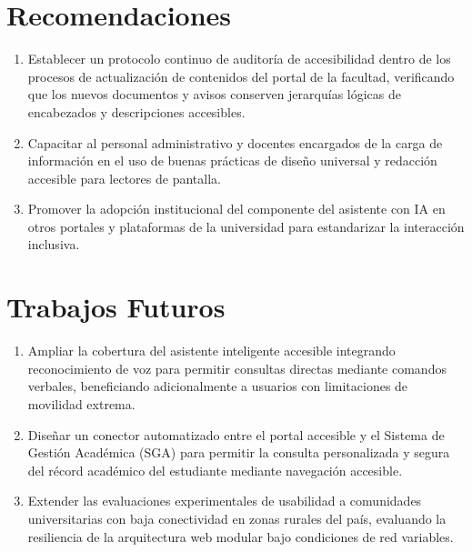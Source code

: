 \section{Recomendaciones}
\begin{enumerate}
  \item Establecer un protocolo continuo de auditoría de accesibilidad dentro de los procesos de actualización de contenidos del portal de la facultad, verificando que los nuevos documentos y avisos conserven jerarquías lógicas de encabezados y descripciones accesibles.
  \item Capacitar al personal administrativo y docentes encargados de la carga de información en el uso de buenas prácticas de diseño universal y redacción accesible para lectores de pantalla.
  \item Promover la adopción institucional del componente del asistente con IA en otros portales y plataformas de la universidad para estandarizar la interacción inclusiva.
\end{enumerate}

\section{Trabajos Futuros}
\begin{enumerate}
  \item Ampliar la cobertura del asistente inteligente accesible integrando reconocimiento de voz para permitir consultas directas mediante comandos verbales, beneficiando adicionalmente a usuarios con limitaciones de movilidad extrema.
  \item Diseñar un conector automatizado entre el portal accesible y el Sistema de Gestión Académica (SGA) para permitir la consulta personalizada y segura del récord académico del estudiante mediante navegación accesible.
  \item Extender las evaluaciones experimentales de usabilidad a comunidades universitarias con baja conectividad en zonas rurales del país, evaluando la resiliencia de la arquitectura web modular bajo condiciones de red variables.
\end{enumerate}
